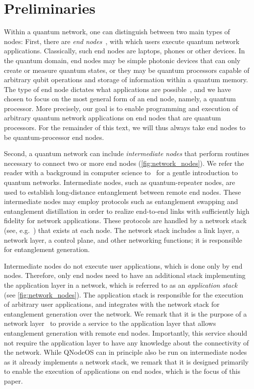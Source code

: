 \chapter
 [Preliminaries]
 {Preliminaries}
\label{chp:background}


Within a quantum network, one can distinguish between two main types of nodes: First, there are \emph{end nodes}~\cite{wehner_2018_stages}, with which users execute quantum network applications.
Classically, such end nodes are laptops, phones or other devices.
In the quantum domain, end nodes may be simple photonic devices that can only create or measure quantum states, or they may be quantum processors capable of arbitrary qubit operations and storage of information within a quantum memory.
The type of end node dictates what applications are possible~\cite{wehner_2018_stages}, and we have chosen to focus on the most general form of an end node, namely, a quantum processor.
More precisely, our goal is to enable programming and execution of arbitrary quantum network applications on end nodes that are quantum processors.
For the remainder of this text, we will thus always take end nodes to be quantum-processor end nodes.

Second, a quantum network can include \emph{intermediate nodes} that perform routines necessary to connect two or more end nodes (\cref{fig:network_nodes}).
We refer the reader with a background in computer science to~\cite{vanMeter_book} for a gentle introduction to quantum networks. 
Intermediate nodes, such as quantum-repeater nodes, are used to establish long-distance entanglement between remote end nodes.
These intermediate nodes may employ protocols such as entanglement swapping and entanglement distillation in order to realize end-to-end links with sufficiently high fidelity for network applications.
These protocols are handled by a network stack (see, e.g.~\cite{dahlberg_2019_egp}) that exists at each node.
The network stack includes a link layer, a network layer, a control plane, and other networking functions; it is responsible for entanglement generation.

Intermediate nodes do not execute user applications, which is done only by end nodes. 
Therefore, only end nodes need to have an additional stack implementing the application layer in a network, which is referred to as an \emph{application stack} (see \cref{fig:network_nodes}).
The application stack is responsible for the execution of arbitrary user applications, and integrates with the network stack for entanglement generation over the network.
We remark that it is the purpose of a network layer~\cite{dahlberg_2019_egp, kozlowski_2020_qnp} to provide a service to the application layer that allows entanglement generation with remote end nodes.
Importantly, this service should not require the application layer to have any knowledge about the connectivity of the network.
While QNodeOS can in principle also be run on intermediate nodes as it already implements a network stack, we remark that it is designed primarily to enable the execution of applications on end nodes, which is the focus of this paper. 

